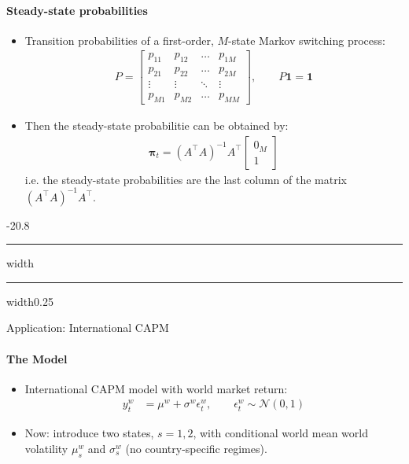 \documentclass[a4paper,landscape,8pt,fleqn]{scrartcl}
\makeatletter
\renewcommand{\subsection}{\@startsection{subsection}{1}{0mm}%
{-2\baselineskip}{0.8\baselineskip}%
{\hrule depth 0.2pt width\columnwidth\hrule depth0.75pt
width0.25\columnwidth\vspace*{1.2em}\large\bfseries}}
\makeatother
\begin{document}
\begin{multicols*}{3}
\paragraph{Steady-state probabilities}
\begin{itemize}
\item Transition probabilities of a first-order, $M$-state Markov switching process:
\begin{align*}
P = \begin{bmatrix}
p_{11} & p_{12} & \ldots & p_{1M} \\
p_{21} & p_{22} & \ldots & p_{2M} \\
\vdots & \vdots & \ddots & \vdots \\
p_{M1} & p_{M2} & \ldots & p_{MM}
\end{bmatrix}, \qquad
P \bm 1 = \bm 1
\end{align*}
\item Then the steady-state probabilitie can be obtained by:
\begin{align*}
\bm \pi_t = (A^\top A)^{-1} A^\top \begin{bmatrix} 0_M \\ 1 \end{bmatrix}
\end{align*}
i.e. the steady-state probabilities are the last column of the matrix $(A^\top A)^{-1} A^\top$.
\end{itemize}

\subsection{Application: International CAPM}

\paragraph{The Model}
\begin{itemize}
\item International CAPM model with world market return:
\begin{align*}
y_t^w &= \mu^w + \sigma^w \epsilon_t^w, \qquad \epsilon_t^w \sim \mathcal{N}(0,1)
\end{align*}
\item Now: introduce two states, $s=1,2$, with conditional world mean world volatility $\mu_s^w$ and $\sigma_s^w$ (no country-specific regimes).
\end{itemize}


\end{multicols*}
\end{document}
